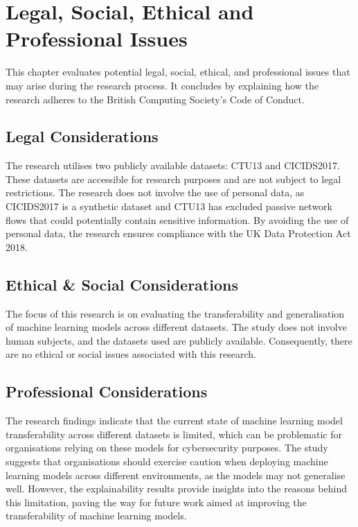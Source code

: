 \chapter{Legal, Social, Ethical and Professional Issues}

This chapter evaluates potential legal, social, ethical, and professional issues that may arise during the research process. It concludes by explaining how the research adheres to the British Computing Society's Code of Conduct.

\section{Legal Considerations}

The research utilises two publicly available datasets: CTU13 and CICIDS2017. These datasets are accessible for research purposes and are not subject to legal restrictions. The research does not involve the use of personal data, as CICIDS2017 is a synthetic dataset and CTU13 has excluded passive network flows that could potentially contain sensitive information. By avoiding the use of personal data, the research ensures compliance with the UK Data Protection Act 2018.

\section{Ethical \& Social Considerations}

The focus of this research is on evaluating the transferability and generalisation of machine learning models across different datasets. The study does not involve human subjects, and the datasets used are publicly available. Consequently, there are no ethical or social issues associated with this research.

\section{Professional Considerations}

The research findings indicate that the current state of machine learning model transferability across different datasets is limited, which can be problematic for organisations relying on these models for cybersecurity purposes. The study suggests that organisations should exercise caution when deploying machine learning models across different environments, as the models may not generalise well. However, the explainability results provide insights into the reasons behind this limitation, paving the way for future work aimed at improving the transferability of machine learning models.

